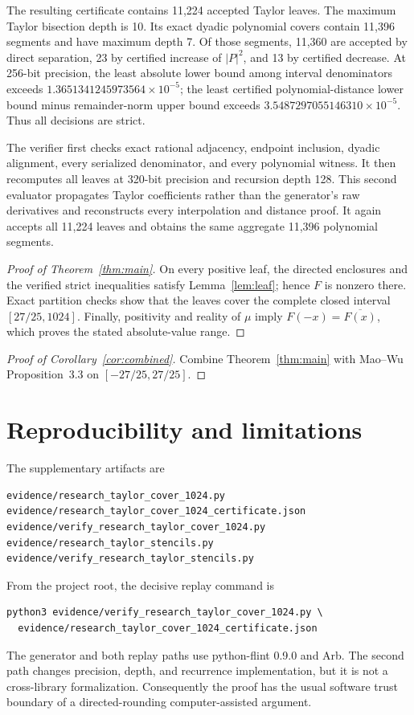 \documentclass[11pt]{article}
\begin{document}
The resulting certificate contains 11,224 accepted Taylor leaves.  The
maximum Taylor bisection depth is 10.  Its exact dyadic polynomial covers
contain 11,396 segments and have maximum depth 7.  Of those segments, 11,360
are accepted by direct separation, 23 by certified increase of $|P|^2$, and
13 by certified decrease.  At 256-bit precision, the least absolute lower
bound among interval denominators exceeds
$1.3651341245973564\times10^{-5}$; the least certified polynomial-distance
lower bound minus remainder-norm upper bound exceeds
$3.5487297055146310\times10^{-5}$.  Thus all decisions are strict.

The verifier first checks exact rational adjacency, endpoint inclusion,
dyadic alignment, every serialized denominator, and every polynomial
witness.  It then recomputes all leaves at 320-bit precision and recursion
depth 128.  This second evaluator propagates Taylor coefficients rather than
the generator's raw derivatives and reconstructs every interpolation and
distance proof.  It again accepts all 11,224 leaves and obtains the same
aggregate 11,396 polynomial segments.

\begin{proof}[Proof of Theorem~\ref{thm:main}]
On every positive leaf, the directed enclosures and the verified strict
inequalities satisfy Lemma~\ref{lem:leaf}; hence $F$ is nonzero there.
Exact partition checks show that the leaves cover the complete closed
interval $[27/25,1024]$.  Finally, positivity and reality of $\mu$ imply
$F(-x)=\overline{F(x)}$, which proves the stated absolute-value range.
\end{proof}

\begin{proof}[Proof of Corollary~\ref{cor:combined}]
Combine Theorem~\ref{thm:main} with Mao--Wu Proposition~3.3 on
$[-27/25,27/25]$.
\end{proof}

\section{Reproducibility and limitations}

The supplementary artifacts are
\begin{verbatim}
evidence/research_taylor_cover_1024.py
evidence/research_taylor_cover_1024_certificate.json
evidence/verify_research_taylor_cover_1024.py
evidence/research_taylor_stencils.py
evidence/verify_research_taylor_stencils.py
\end{verbatim}
From the project root, the decisive replay command is
\begin{verbatim}
python3 evidence/verify_research_taylor_cover_1024.py \
  evidence/research_taylor_cover_1024_certificate.json
\end{verbatim}
The generator and both replay paths use python-flint 0.9.0 and Arb.  The
second path changes precision, depth, and recurrence implementation, but it
is not a cross-library formalization.  Consequently the proof has the usual
software trust boundary of a directed-rounding computer-assisted argument.
\end{document}
